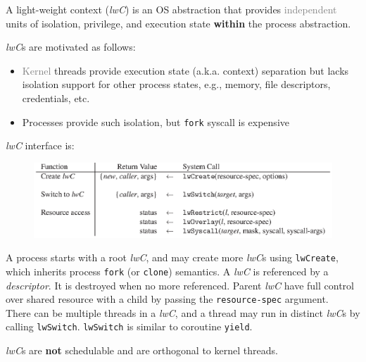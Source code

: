 
\begin{definition}
A light-weight context (\textit{lwC}) is an OS abstraction that provides \textcolor{gray}{independent} units of isolation, privilege, and execution state \textbf{within} the process abstraction.
\end{definition}

\textit{lwC}s are motivated as follows:

\begin{itemize}
    \item \textcolor{gray}{Kernel} threads provide execution state (a.k.a. context) separation but lacks isolation support for other process states, e.g., memory, file descriptors, credentials, etc.
    \item Processes provide such isolation, but \verb|fork| syscall is expensive
\end{itemize}

\textit{lwC} interface is:

\begin{figure}[H]
\centering
\includegraphics[width=1\linewidth]{figures/lwC_ifc.eps}
\end{figure}

A process starts with a root \textit{lwC}, and may create more \textit{lwC}s using \verb|lwCreate|, which inherits process \verb|fork| (or \verb|clone|) semantics. A \textit{lwC} is referenced by a \textit{descriptor}. It is destroyed when no more referenced. Parent \textit{lwC} have full control over shared resource with a child by passing the \verb|resource-spec| argument. \\

There can be multiple threads in a \textit{lwC}, and a thread may run in distinct \textit{lwC}s by calling \verb|lwSwitch|. \verb|lwSwitch| is similar to coroutine \verb|yield|.

\begin{note}
\textit{lwC}s are \textbf{not} schedulable and are orthogonal to kernel threads.
\end{note}

